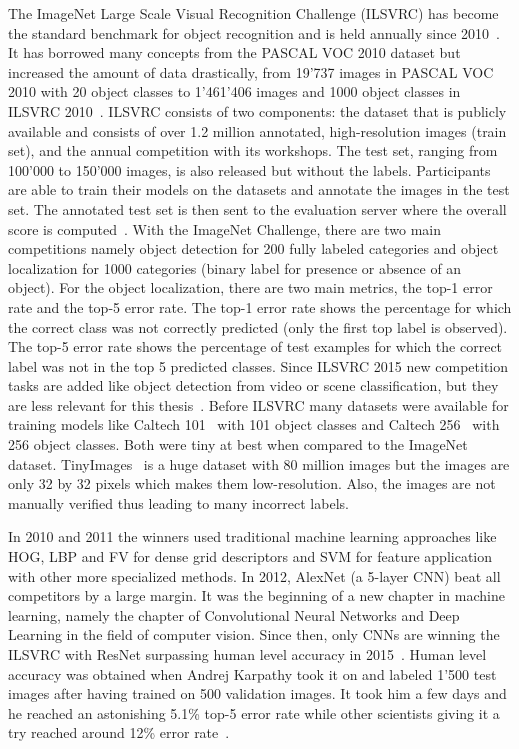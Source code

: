 The ImageNet Large Scale Visual Recognition Challenge (ILSVRC) has become the standard benchmark for object recognition and is held annually since 2010~\cite{imagenet}. It has borrowed many concepts from the PASCAL VOC 2010 dataset but increased the amount of data drastically, from 19'737 images in PASCAL VOC 2010 with 20 object classes to 1'461'406 images and 1000 object classes in ILSVRC 2010~\cite{everingham2010pascal, russakovsky2015imagenet}. ILSVRC consists of two components: the dataset that is publicly available and consists of over 1.2 million annotated, high-resolution images (train set), and the annual competition with its workshops. The test set, ranging from 100'000 to 150'000 images, is also released but without the labels. Participants are able to train their models on the datasets and annotate the images in the test set. The annotated test set is then sent to the evaluation server where the overall score is computed~\cite{russakovsky2015imagenet}. With the ImageNet Challenge, there are two main competitions namely object detection for 200 fully labeled categories and object localization for 1000 categories (binary label for presence or absence of an object). For the object localization, there are two main metrics, the top-1 error rate and the top-5 error rate. The top-1 error rate shows the percentage for which the correct class was not correctly predicted (only the first top label is observed). The top-5 error rate shows the percentage of test examples for which the correct label was not in the top 5 predicted classes. Since ILSVRC 2015 new competition tasks are added like object detection from video or scene classification, but they are less relevant for this thesis~\cite{imagenet2015}. Before ILSVRC many datasets were available for training models like Caltech 101~\cite{fei2007learning} with 101 object classes and Caltech 256~\cite{griffin2007caltech} with 256 object classes. Both were tiny at best when compared to the ImageNet dataset. TinyImages~\cite{torralba200880} is a huge dataset with 80 million images but the images are only 32 by 32 pixels which makes them low-resolution. Also, the images are not manually verified thus leading to many incorrect labels.

In 2010 and 2011 the winners used traditional machine learning approaches like HOG, LBP and FV for dense grid descriptors and SVM for feature application with other more specialized methods. In 2012, AlexNet (a 5-layer CNN) beat all competitors by a large margin. It was the beginning of a new chapter in machine learning, namely the chapter of Convolutional Neural Networks and Deep Learning in the field of computer vision. Since then, only CNNs are winning the ILSVRC with ResNet surpassing human level accuracy in 2015~\cite{he2016deep}. Human level accuracy was obtained when Andrej Karpathy took it on and labeled 1'500 test images after having trained on 500 validation images. It took him a few days and he reached an astonishing 5.1\% top-5 error rate while other scientists giving it a try reached around 12\% error rate~\cite{humanlevel2014}.

